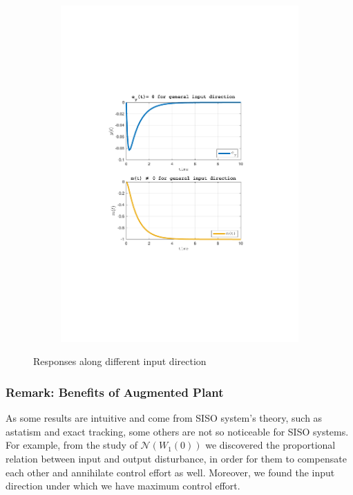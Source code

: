 \documentclass[a4paper, 12pt]{article}
\begin{document}
\begin{figure}[h!]{}
\begin{subfigure}[t]{0.32\textwidth}
           \includegraphics[width=\textwidth]{Figures/fig03c.pdf}
           \label{fig:fig03c}
    \end{subfigure}
    \caption{Responses along different input direction}
    \label{fig:fig03}
   \end{figure}
\subsubsection*{Remark: Benefits of Augmented Plant}
As some results are intuitive and come from SISO system's theory, such as astatism and exact tracking, some others are not so noticeable for SISO systems. For example, from the study of $\mathcal{N}(W_1(0))$ we discovered the proportional relation between input and output disturbance, in order for them to compensate each other and annihilate control effort as well. Moreover, we found the input direction under which we have maximum control effort.
\end{document}
